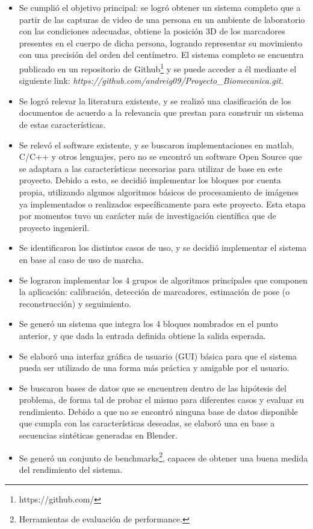 \begin{itemize}
\item Se cumplió el objetivo principal: se logró obtener un sistema completo que a partir de las capturas de video de una persona en un ambiente de laboratorio con las condiciones adecuadas, obtiene la posición 3D de  los marcadores presentes en el cuerpo de dicha persona, logrando representar su movimiento con una precisión del orden del centímetro. El sistema completo se encuentra publicado en un repositorio de Github\footnote{https://github.com/} y se puede acceder a él mediante el siguiente link: \emph{https://github.com/andreig09/Proyecto\_Biomecanica.git}.
\item Se logró relevar la literatura existente, y se realizó una clasificación de los documentos de acuerdo a la relevancia que prestan para construir un sistema de estas características. 
\item Se relevó el software existente, y se buscaron implementaciones en matlab, C/C++ y otros lenguajes, pero no se encontró un software Open Source que se adaptara a las características necesarias para utilizar de base en este proyecto. Debido a esto, se decidió implementar los bloques por cuenta propia, utilizando algunos algoritmos básicos de procesamiento de imágenes ya implementados o realizados específicamente para este proyecto. Esta etapa por momentos tuvo un carácter más de investigación científica que de proyecto ingenieril.
\item Se identificaron los distintos casos de uso, y se decidió implementar el sistema en base al caso de uso de marcha.
\item Se lograron implementar los 4 grupos de algoritmos principales que componen la aplicación: calibración, detección de marcadores, estimación de pose (o reconstrucción) y seguimiento.
\item Se generó un sistema que integra los 4 bloques nombrados en el punto anterior, y que dada la entrada definida obtiene la salida esperada.
\item Se elaboró una interfaz gráfica de usuario (GUI) básica para que el sistema pueda ser utilizado de una forma más práctica y amigable por el usuario.
\item Se buscaron bases de datos que se encuentren dentro de las hipótesis del problema, de forma tal de probar el mismo para diferentes casos y evaluar su rendimiento. Debido a que no se encontró ninguna base de datos disponible que cumpla con las características deseadas, se elaboró una en base a secuencias sintéticas generadas en Blender.
\item Se generó un conjunto de benchmarks\footnote{Herramientas de evaluación de performance.}, capaces de obtener una buena medida del rendimiento del sistema. 
\end{itemize}

